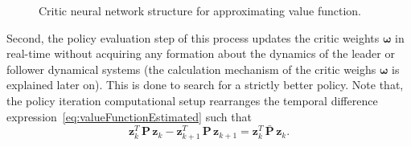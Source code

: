 \documentclass[letterpaper]{article} %
\begin{document}
\begin{figure}
{\begin{adjustbox}{max width = 0.4\textwidth}
        \end{adjustbox}      
    }
    \caption{Critic neural network structure for approximating value function.}
    \label{fig:nnCritic}
      \end{figure}
%      
Second, the policy evaluation step of this process updates the critic weights $\bm{\omega}$ in real-time without acquiring any formation about the dynamics of the leader or follower dynamical systems  (the calculation mechanism of the critic weighs $\boldsymbol{\omega}$ is explained later on). This is done to search for a strictly better policy. %
%
Note that, the policy iteration computational setup rearranges the temporal difference expression~\eqref{eq:valueFunctionEstimated} such that %
%
\begin{equation}
\label{eq:const}
\mathbf{z}_k^T\, \mathbf{P}\, \mathbf{z}_k - \mathbf{z}_{k+1}^T\, \mathbf{P}\, \mathbf{z}_{k+1} = \mathbf{z}_k^T\, \bar{\mathbf{P}}\, \mathbf{z}_k. 
\end{equation}
\end{document}
